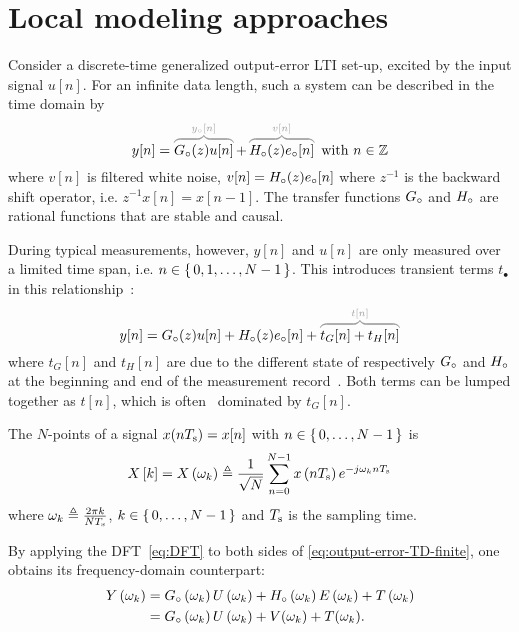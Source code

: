 \section{Local modeling approaches}
\label{sec:theory}

Consider a discrete-time generalized output-error \gls{LTI} set-up, excited by the input signal $u[n]$.
For an infinite data length, such a system can be described in the time domain by
\begin{equation}
  y[n] = \ezbrace{\true{G}(z) u[n]}{\true{y}[n]} + \ezbrace{\true{H}(z) \true{e}[n]}{v[n]} \text{ with } n \in \ZZ
  \label{eq:output-error-TD-infinite}
\end{equation}
where $v[n]$ is filtered white noise, $v[n] = {H}_{\circ}(z) {e}_{\circ}[n]$ where $z^{-1}$ is the backward shift operator, i.e. $z^ {-1}x[n] = x[n-1]$.
The transfer functions ${G}_{\circ}$ and ${H}_{\circ}$ are rational functions that are stable and causal.

During typical measurements, however, $y[n]$ and $u[n]$ are only measured over a limited time span, i.e. $n \in \set{0,1,\ldots,N-1}$.
This introduces transient terms $t_{\bullet}$ in this relationship~\citep{Pintelon1997ARB}:
\begin{equation}
y[n] = \true{G}(z) u[n] + \true{H}(z) \true{e}[n] + \ezbrace{t_G[n] + t_H[n]}{t[n]}
\label{eq:output-error-TD-finite}
\end{equation}
where $t_G[n]$ and $t_H[n]$ are due to the different state of respectively ${G}_{\circ}$ and ${H}_{\circ}$ at the beginning and end of the measurement record~\citep{Pintelon1997ARB}.
Both terms can be lumped together as $t[n]$, which is often~\citep{Pintelon2010LPM1} dominated by $t_G[n]$.

\begin{definition}\label{def:DFT}
The $N$-points  of a signal $x(nT_{\mathrm{s}}) = x[n]$ with $n \in \set{0,\ldots,N-1}$ is
\begin{equation}
  X \left[ k \right] =
  X \left( \omega_k \right)
  \triangleq
  \frac{1}{\sqrt{N}}\sum_{n=0}^{N-1} x \left( n T_{\mathrm{s}} \right)  e^{- j \omega_k n T_{\mathrm{s}} }
  \label{eq:DFT}
\end{equation}
where $\omega_k \triangleq \tfrac{2 \pi k }{N T_{\mathrm{s}}}$, $k \in \set{0,\ldots,N-1}$ and $T_{\mathrm{s}}$ is the sampling time.
\end{definition}

By applying the \gls{DFT}~\eqref{eq:DFT} to both sides of \eqref{eq:output-error-TD-finite}, one obtains its frequency-domain counterpart:
\begin{align}
    Y \left( \omega_k \right) 
    & = {G}_{\circ} \left( \omega_k \right) U \left( \omega_k \right) 
      + {H}_{\circ} \left( \omega_k \right) E \left( \omega_k \right)
      + T \left( \omega_k \right)\\
      &= {G}_{\circ} \left( \omega_k \right) U \left( \omega_k \right)  + V(\omega_k) + T(\omega_k)
      \text{.}
  \label{eq:output-error-FD}
\end{align}


